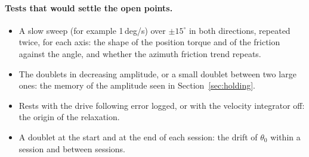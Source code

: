 \documentclass[10pt,a4paper]{article}
\numberwithin{equation}{section}
\begin{document}
\paragraph{Tests that would settle the open points.}
\begin{itemize}
\item A slow sweep (for example 1\,deg/s) over $\pm15^\circ$ in both directions, repeated twice, for each axis: the shape of the position torque and of the friction against the angle, and whether the azimuth friction trend repeats.
\item The doublets in decreasing amplitude, or a small doublet between two large ones: the memory of the amplitude seen in Section~\ref{sec:holding}.
\item Rests with the drive following error logged, or with the velocity integrator off: the origin of the relaxation.
\item A doublet at the start and at the end of each session: the drift of $\theta_0$ within a session and between sessions.
\end{itemize}
\end{document}
